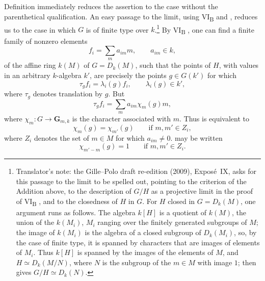 Definition  immediately reduces
the assertion to the case without the parenthetical qualification. An
easy passage to the limit, using VI\textsubscript{B}  and ,
reduces us to the case in which \(G\) is of finite type over
\(k\).\footnote{Translator's note: the Gille--Polo draft re-edition (2009),
Expos\'e~IX, asks for this passage to the limit to be spelled out, pointing
to the criterion of the Addition above, to the description of \(G/H\) as a
projective limit in the proof of VI\textsubscript{B}
, and to the closedness of \(H\) in
\(G\). For \(H\) closed in \(G=D_k(M)\), one argument runs as follows. The
algebra \(k[H]\) is a quotient of \(k(M)\), the union of the \(k(M_i)\),
\(M_i\) ranging over the finitely generated subgroups of \(M\); the image of
\(k(M_i)\) is the algebra of a closed subgroup of \(D_k(M_i)\), so, by the
case of finite type, it is spanned by characters that are images of elements
of \(M_i\). Thus \(k[H]\) is spanned by the images of the elements of \(M\),
and \(H\simeq D_k(M/N)\), where \(N\) is the subgroup of the \(m\in M\) with
image \(1\);  then gives
\(G/H\simeq D_k(N)\).}
By VI\textsubscript{B} , one can find a finite
family of nonzero elements
\begin{equation}
  \tag{8.1.1}
  f_i=\sum_m a_{im}m,\qquad a_{im}\in k,
\end{equation}
of the affine ring \(k(M)\) of \(G=D_k(M)\), such that the points of
\(H\), with values in an arbitrary \(k\)-algebra \(k'\), are precisely
the points \(g\in G(k')\) for which
\begin{equation}
  \tag{8.1.2}
  \tau_g f_i=\lambda_i(g)f_i,
  \qquad \lambda_i(g)\in k',
\end{equation}
where \(\tau_g\) denotes translation by \(g\). But
\begin{equation}
  \tag{8.1.3}
  \tau_g f_i=\sum_m a_{im}\chi_m(g)m,
\end{equation}
where \(\chi_m:G\to\mathbf G_{m,k}\) is the character associated with
\(m\). Thus  is equivalent to
\begin{equation}
  \tag{8.1.4}
  \chi_m(g)=\chi_{m'}(g)
  \qquad\text{if }m,m'\in Z_i,
\end{equation}
where \(Z_i\) denotes the set of \(m\in M\) for which \(a_{im}\neq0\).
 may be written
\[
  \chi_{m'-m}(g)=1
  \qquad\text{if }m,m'\in Z_i.
\]

